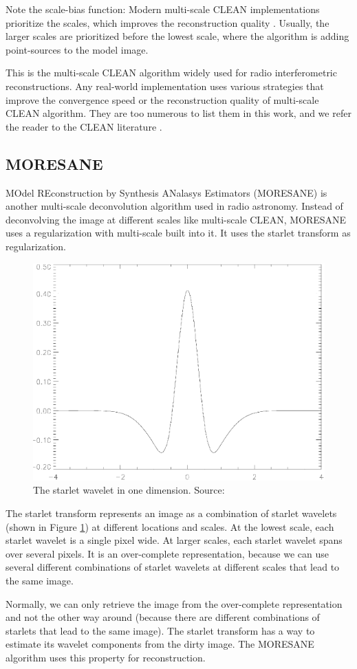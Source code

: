 Note the scale-bias function: Modern multi-scale CLEAN implementations prioritize the scales, which improves the reconstruction quality \cite{offringa2017optimized}. Usually, the larger scales are prioritized before the lowest scale, where the algorithm is adding point-sources to the model image. 

This is the multi-scale CLEAN algorithm widely used for radio interferometric reconstructions. Any real-world implementation uses various strategies that improve the convergence speed or the reconstruction quality of multi-scale CLEAN algorithm. They are too numerous to list them in this work, and we refer the reader to the CLEAN literature \cite{hogbom1974aperture, clark1980efficient, schwab1984relaxing}.


\subsection{MORESANE}
MOdel REconstruction by Synthesis ANalasys Estimators (MORESANE) is another multi-scale deconvolution algorithm used in radio astronomy. Instead of deconvolving the image at different scales like multi-scale CLEAN, MORESANE uses a regularization with multi-scale built into it. It uses the starlet transform \cite{starck2015starlet} as regularization.

\begin{figure}[h]
	\centering
	\includegraphics[width=0.3\linewidth]{./chapters/02.state/wavelet.png}
	\caption{The starlet wavelet in one dimension. Source: \cite{starck2015starlet}}
	\label{state:moresane:starlet}
\end{figure}

The starlet transform represents an image as a combination of starlet wavelets (shown in Figure \ref{state:moresane:starlet}) at different locations and scales. At the lowest scale, each starlet wavelet is a single pixel wide. At larger scales, each starlet wavelet spans over several pixels. It is an over-complete representation, because we can use several different combinations of starlet wavelets at different scales that lead to the same image.

Normally, we can only retrieve the image from the over-complete representation and not the other way around (because there are different combinations of starlets that lead to the same image). The starlet transform has a way to estimate its wavelet components from the dirty image. The MORESANE algorithm uses this property for reconstruction.


